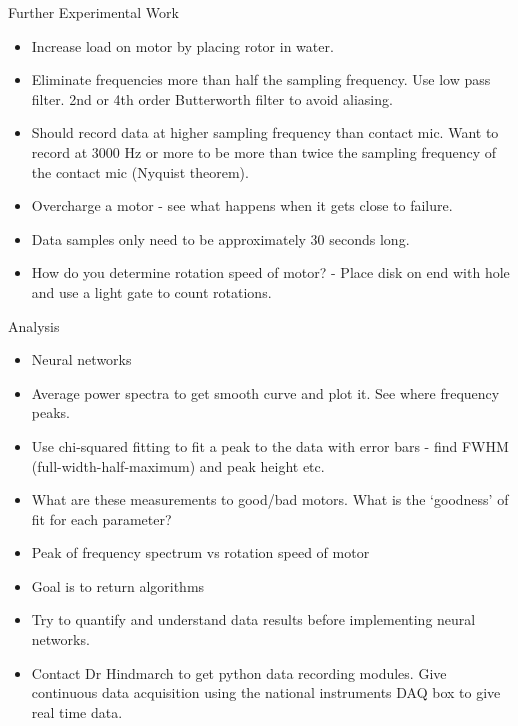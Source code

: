 \large{Further Experimental Work}
\begin{itemize}
\item
Increase load on motor by placing rotor in water.

\item
Eliminate frequencies more than half the sampling frequency. Use low pass filter. 2nd or 4th order Butterworth filter to avoid aliasing.

\item
Should record data at higher sampling frequency than contact mic. Want to record at 3000 Hz or more to be more than twice the sampling frequency of the contact mic (Nyquist theorem).

\item
Overcharge a motor - see what happens when it gets close to failure.

\item
Data samples only need to be approximately 30 seconds long.

\item
How do you determine rotation speed of motor? - Place disk on end with hole and use a light gate to count rotations.

\end{itemize}

\large{Analysis}
\begin{itemize}
\item
Neural networks

\item
Average power spectra to get smooth curve and plot it. See where frequency peaks.

\item
Use chi-squared fitting to fit a peak to the data with error bars - find FWHM (full-width-half-maximum) and peak height etc.

\item
What are these measurements to good/bad motors. What is the `goodness' of fit for each parameter?

\item
Peak of frequency spectrum vs rotation speed of motor

\item
Goal is to return algorithms

\item
Try to quantify and understand data results before implementing neural networks.

\item
Contact Dr Hindmarch to get python data recording modules. Give continuous data acquisition using the national instruments DAQ box to give real time data.

\end{itemize}

